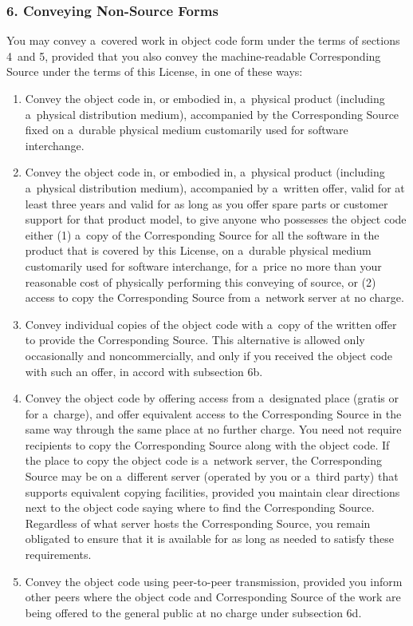 \documentclass[a4paper, 11pt, twoside]{article}
\begin{document}
\subsubsection{6. Conveying Non-Source Forms}

You may convey a~covered work in object code form under the terms of sections 4~and 5, provided that you also convey the machine-readable Corresponding Source under the terms of this License, in one of these ways:

\begin{enumerate}[label=\Alph*)]
\item Convey the object code in, or embodied in, a~physical product (including a~physical distribution medium), accompanied by the Corresponding Source fixed on a~durable physical medium customarily used for software interchange.
\item Convey the object code in, or embodied in, a~physical product (including a~physical distribution medium), accompanied by a~written offer, valid for at least three years and valid for as long as you offer spare parts or customer support for that product model, to give anyone who possesses the object code either (1) a~copy of the Corresponding Source for all the software in the product that is covered by this License, on a~durable physical medium customarily used for software interchange, for a~price no more than your reasonable cost of physically performing this conveying of source, or (2) access to copy the Corresponding Source from a~network server at no charge.
\item Convey individual copies of the object code with a~copy of the written offer to provide the Corresponding Source. This alternative is allowed only occasionally and noncommercially, and only if you received the object code with such an offer, in accord with subsection 6b.
\item Convey the object code by offering access from a~designated place (gratis or for a~charge), and offer equivalent access to the Corresponding Source in the same way through the same place at no further charge. You need not require recipients to copy the Corresponding Source along with the object code. If the place to copy the object code is a~network server, the Corresponding Source may be on a~different server (operated by you or a~third party) that supports equivalent copying facilities, provided you maintain clear directions next to the object code saying where to find the Corresponding Source. Regardless of what server hosts the Corresponding Source, you remain obligated to ensure that it is available for as long as needed to satisfy these requirements.
\item Convey the object code using peer-to-peer transmission, provided you inform other peers where the object code and Corresponding Source of the work are being offered to the general public at no charge under subsection 6d.
\end{enumerate}
\end{document}
